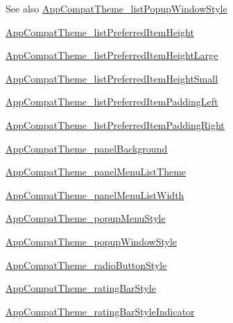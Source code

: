 \begin{DoxySeeAlso}{See also}
\hyperlink{classandroid_1_1support_1_1v4_1_1R_1_1styleable_ae7d26e004b40152e1dfd2b283043a64f}{App\+Compat\+Theme\+\_\+list\+Popup\+Window\+Style} 

\hyperlink{classandroid_1_1support_1_1v4_1_1R_1_1styleable_a9b71c2c15e2b7ab9c0f8f48771d4444e}{App\+Compat\+Theme\+\_\+list\+Preferred\+Item\+Height} 

\hyperlink{classandroid_1_1support_1_1v4_1_1R_1_1styleable_a4bf9947a5a52f076cfc439791fc78ac5}{App\+Compat\+Theme\+\_\+list\+Preferred\+Item\+Height\+Large} 

\hyperlink{classandroid_1_1support_1_1v4_1_1R_1_1styleable_aad0605b48a4d815b0fdc77f1e4dacb4d}{App\+Compat\+Theme\+\_\+list\+Preferred\+Item\+Height\+Small} 

\hyperlink{classandroid_1_1support_1_1v4_1_1R_1_1styleable_ae536509d1f248feded607e1588900608}{App\+Compat\+Theme\+\_\+list\+Preferred\+Item\+Padding\+Left} 

\hyperlink{classandroid_1_1support_1_1v4_1_1R_1_1styleable_af5e021a7f52cfdc13201bf047025d17d}{App\+Compat\+Theme\+\_\+list\+Preferred\+Item\+Padding\+Right} 

\hyperlink{classandroid_1_1support_1_1v4_1_1R_1_1styleable_a9a25be61219ea77461c9e13d61a6eb9c}{App\+Compat\+Theme\+\_\+panel\+Background} 

\hyperlink{classandroid_1_1support_1_1v4_1_1R_1_1styleable_a70447b234629ffb93fa09bdc74f87251}{App\+Compat\+Theme\+\_\+panel\+Menu\+List\+Theme} 

\hyperlink{classandroid_1_1support_1_1v4_1_1R_1_1styleable_a9241d227f19a221bfd726409aaf1ba40}{App\+Compat\+Theme\+\_\+panel\+Menu\+List\+Width} 

\hyperlink{classandroid_1_1support_1_1v4_1_1R_1_1styleable_ae139527d680dba1ecff676f185c65505}{App\+Compat\+Theme\+\_\+popup\+Menu\+Style} 

\hyperlink{classandroid_1_1support_1_1v4_1_1R_1_1styleable_a36a238eb7c745d998ccfc9bd0e0d4e8c}{App\+Compat\+Theme\+\_\+popup\+Window\+Style} 

\hyperlink{classandroid_1_1support_1_1v4_1_1R_1_1styleable_a72d4902394fb50357cc43cdbde732b4c}{App\+Compat\+Theme\+\_\+radio\+Button\+Style} 

\hyperlink{classandroid_1_1support_1_1v4_1_1R_1_1styleable_a217122fd42bd5c2c280789d4142eb012}{App\+Compat\+Theme\+\_\+rating\+Bar\+Style} 

\hyperlink{classandroid_1_1support_1_1v4_1_1R_1_1styleable_ac0468ac4481514ec954acde9fbd2d3dc}{App\+Compat\+Theme\+\_\+rating\+Bar\+Style\+Indicator} 


\end{DoxySeeAlso}
